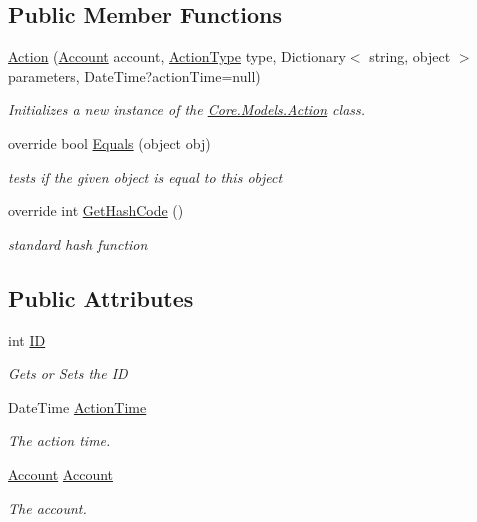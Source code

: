 \subsection*{Public Member Functions}
\begin{DoxyCompactItemize}
\item 
\hyperlink{classCore_1_1Models_1_1Action_ae4a71271ac1200f42b8dad22d565c939}{Action} (\hyperlink{classCore_1_1Models_1_1Account}{Account} account, \hyperlink{classCore_1_1Models_1_1Action_a9e9cef4702eef3e7d99f5db15e8c4640}{Action\+Type} type, Dictionary$<$ string, object $>$ parameters, Date\+Time?action\+Time=null)
\begin{DoxyCompactList}\small\item\em Initializes a new instance of the \hyperlink{classCore_1_1Models_1_1Action}{Core.\+Models.\+Action} class. \end{DoxyCompactList}\item 
override bool \hyperlink{classCore_1_1Models_1_1Action_a300fc2dc4c503f4ea9964846f9a434f0}{Equals} (object obj)
\begin{DoxyCompactList}\small\item\em tests if the given object is equal to this object \end{DoxyCompactList}\item 
override int \hyperlink{classCore_1_1Models_1_1Action_a29fa0c569250878b3f04d174cf5677ac}{Get\+Hash\+Code} ()
\begin{DoxyCompactList}\small\item\em standard hash function \end{DoxyCompactList}\end{DoxyCompactItemize}
\subsection*{Public Attributes}
\begin{DoxyCompactItemize}
\item 
int \hyperlink{classCore_1_1Models_1_1Action_a13671e1a48f3a462a366fe2768073816}{I\+D}
\begin{DoxyCompactList}\small\item\em Gets or Sets the I\+D \end{DoxyCompactList}\item 
Date\+Time \hyperlink{classCore_1_1Models_1_1Action_ab973fe9b8e3c6a60fa9d82cf53de57c3}{Action\+Time}
\begin{DoxyCompactList}\small\item\em The action time. \end{DoxyCompactList}\item 
\hyperlink{classCore_1_1Models_1_1Account}{Account} \hyperlink{classCore_1_1Models_1_1Action_a1924816082b3d1173ef309581a69ef95}{Account}
\begin{DoxyCompactList}\small\item\em The account. \end{DoxyCompactList}\end{DoxyCompactItemize}
